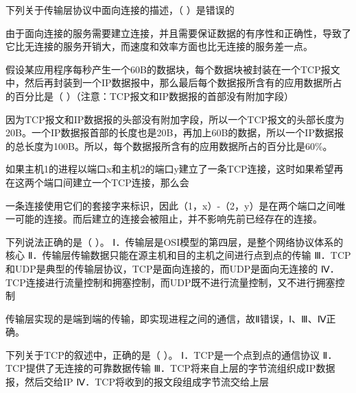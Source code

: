 \question 下列关于传输层协议中面向连接的描述，（ ）是错误的
\par{}
\begin{solution}由于面向连接的服务需要建立连接，并且需要保证数据的有序性和正确性，导致了它比无连接的服务开销大，而速度和效率方面也比无连接的服务差一点。
\end{solution}
\question 假设某应用程序每秒产生一个60B的数据块，每个数据块被封装在一个TCP报文中，然后再封装到一个IP数据报中，那么最后每个数据报所含有的应用数据所占的百分比是（
）（注意：TCP报文和IP数据报的首部没有附加字段）
\par{}
\begin{solution}因为TCP报文和IP数据报的头部没有附加字段，所以一个TCP报文的头部长度为20B。一个IP数据报首部的长度也是20B，再加上60B的数据，所以一个IP数据报的总长度为100B。所以，每个数据报所含有的应用数据所占的百分比是60\%。
\end{solution}
\question 如果主机1的进程以端口x和主机2的端口y建立了一条TCP连接，这时如果希望再在这两个端口间建立一个TCP连接，那么会
\par{}
\begin{solution}一条连接使用它们的套接字来标识，因此（1，x）-（2，y）是在两个端口之间唯一可能的连接。而后建立的连接会被阻止，并不影响先前已经存在的连接。
\end{solution}
\question 下列说法正确的是（ ）。
Ⅰ．传输层是OSI模型的第四层，是整个网络协议体系的核心
Ⅱ．传输层传输数据只能在源主机和目的主机之间进行点到点的传输
Ⅲ．TCP和UDP是典型的传输层协议，TCP是面向连接的，而UDP是面向无连接的
Ⅳ．TCP连接进行流量控制和拥塞控制，而UDP既不进行流量控制，又不进行拥塞控制
\par{}
\begin{solution}传输层实现的是端到端的传输，即实现进程之间的通信，故Ⅱ错误，Ⅰ、Ⅲ、Ⅳ正确。
\end{solution}
\question 下列关于TCP的叙述中，正确的是（ ）。 Ⅰ．TCP是一个点到点的通信协议
Ⅱ．TCP提供了无连接的可靠数据传输
Ⅲ．TCP将来自上层的字节流组织成IP数据报，然后交给IP
Ⅳ．TCP将收到的报文段组成字节流交给上层
\par{}
